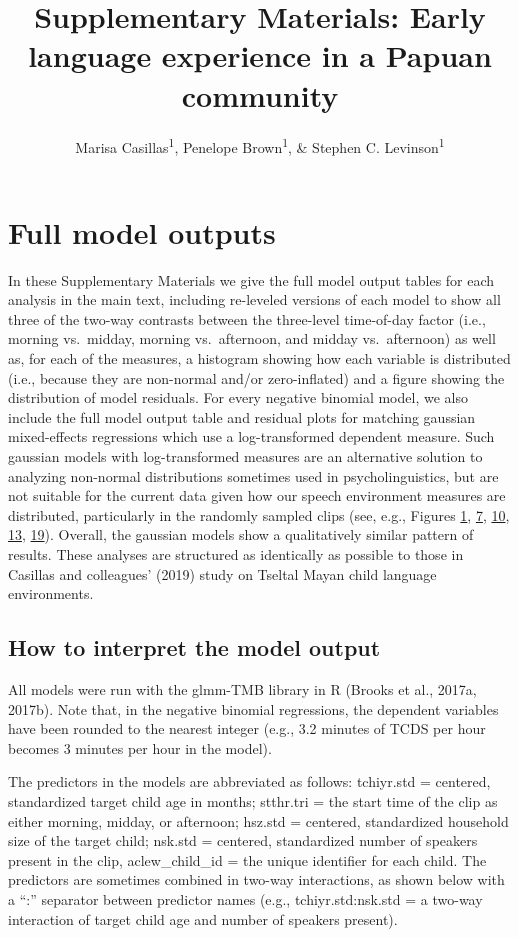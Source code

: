 \documentclass[,man,floatsintext]{apa6}
\title{Supplementary Materials: Early language experience in a Papuan community}
\author{Marisa Casillas\textsuperscript{1}, Penelope Brown\textsuperscript{1},
\& Stephen C. Levinson\textsuperscript{1}}
\date{}
\affiliation{
\vspace{0.5cm}
\textsuperscript{1} Max Planck Institute for Psycholinguistics}
\begin{document}
\maketitle

\section{Full model outputs}\label{models}

In these Supplementary Materials we give the full model output tables
for each analysis in the main text, including re-leveled versions of
each model to show all three of the two-way contrasts between the
three-level time-of-day factor (i.e., morning vs.~midday, morning
vs.~afternoon, and midday vs.~afternoon) as well as, for each of the
measures, a histogram showing how each variable is distributed (i.e.,
because they are non-normal and/or zero-inflated) and a figure showing
the distribution of model residuals. For every negative binomial model,
we also include the full model output table and residual plots for
matching gaussian mixed-effects regressions which use a log-transformed
dependent measure. Such gaussian models with log-transformed measures
are an alternative solution to analyzing non-normal distributions
sometimes used in psycholinguistics, but are not suitable for the
current data given how our speech environment measures are distributed,
particularly in the randomly sampled clips (see, e.g., Figures
\protect\hyperlink{fig1}{1}, \protect\hyperlink{fig7}{7},
\protect\hyperlink{fig10}{10}, \protect\hyperlink{fig13}{13},
\protect\hyperlink{fig19}{19}). Overall, the gaussian models show a
qualitatively similar pattern of results. These analyses are structured
as identically as possible to those in Casillas and colleagues' (2019)
study on Tseltal Mayan child language environments.

\subsection{How to interpret the model
output}\label{how-to-interpret-the-model-output}

All models were run with the glmm-TMB library in R (Brooks et al.,
2017a, 2017b). Note that, in the negative binomial regressions, the
dependent variables have been rounded to the nearest integer (e.g., 3.2
minutes of TCDS per hour becomes 3 minutes per hour in the model).

The predictors in the models are abbreviated as follows: tchiyr.std =
centered, standardized target child age in months; stthr.tri = the start
time of the clip as either morning, midday, or afternoon; hsz.std =
centered, standardized household size of the target child; nsk.std =
centered, standardized number of speakers present in the clip,
aclew\_child\_id = the unique identifier for each child. The predictors
are sometimes combined in two-way interactions, as shown below with a
\enquote{:} separator between predictor names (e.g., tchiyr.std:nsk.std
= a two-way interaction of target child age and number of speakers
present).
\end{document}
